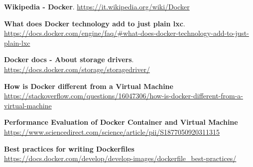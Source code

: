 \documentclass[a4paper,10pt]{memoir}
\begin{document}
\begin{thebibliography}{9}
  \textbf{Wikipedia - Docker}.
  \href{https://it.wikipedia.org/wiki/Docker/}{https://it.wikipedia.org/wiki/Docker}

  \textbf{What does Docker technology add to just plain lxc}.\\
  \href{https://docs.docker.com/engine/faq/#what-does-docker-technology-add-to-just-plain-lxc}{https://docs.docker.com/engine/faq/\#what-does-docker-technology-add-to-just-plain-lxc}

  \textbf{Docker docs - About storage drivers}.\\
  \href{https://docs.docker.com/storage/storagedriver/}{https://docs.docker.com/storage/storagedriver/}

    \textbf{How is Docker different from a Virtual Machine}
    \\
    \href{https://stackoverflow.com/questions/16047306/how-is-docker-different-from-a-virtual-machine}{https://stackoverflow.com/questions/16047306/how-is-docker-different-from-a-virtual-machine}

    \textbf{Performance Evaluation of Docker Container and Virtual Machine}
    \\
    \href{https://www.sciencedirect.com/science/article/pii/S1877050920311315}{https://www.sciencedirect.com/science/article/pii/S1877050920311315}

    \textbf{Best practices for writing Dockerfiles}
    \\
    \href{https://docs.docker.com/develop/develop-images/dockerfile_best-practices/}{https://docs.docker.com/develop/develop-images/dockerfile\_best-practices/}

\end{thebibliography}
\end{document}
